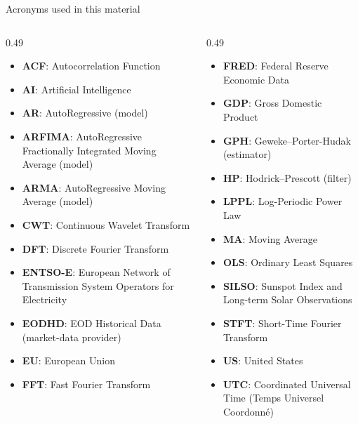 \begin{frame}{Acronyms used in this material}
\begin{columns}[T]
\begin{column}{0.49\textwidth}
\begin{itemize}\setlength{\itemsep}{0pt}
    \item \textbf{ACF}: Autocorrelation Function
    \item \textbf{AI}: Artificial Intelligence
    \item \textbf{AR}: AutoRegressive (model)
    \item \textbf{ARFIMA}: AutoRegressive Fractionally Integrated Moving Average (model)
    \item \textbf{ARMA}: AutoRegressive Moving Average (model)
    \item \textbf{CWT}: Continuous Wavelet Transform
    \item \textbf{DFT}: Discrete Fourier Transform
    \item \textbf{ENTSO-E}: European Network of Transmission System Operators for Electricity
    \item \textbf{EODHD}: EOD Historical Data (market-data provider)
    \item \textbf{EU}: European Union
    \item \textbf{FFT}: Fast Fourier Transform
\end{itemize}
\end{column}
\begin{column}{0.49\textwidth}
\begin{itemize}\setlength{\itemsep}{0pt}
    \item \textbf{FRED}: Federal Reserve Economic Data
    \item \textbf{GDP}: Gross Domestic Product
    \item \textbf{GPH}: Geweke–Porter-Hudak (estimator)
    \item \textbf{HP}: Hodrick–Prescott (filter)
    \item \textbf{LPPL}: Log-Periodic Power Law
    \item \textbf{MA}: Moving Average
    \item \textbf{OLS}: Ordinary Least Squares
    \item \textbf{SILSO}: Sunspot Index and Long-term Solar Observations
    \item \textbf{STFT}: Short-Time Fourier Transform
    \item \textbf{US}: United States
    \item \textbf{UTC}: Coordinated Universal Time (Temps Universel Coordonné)
\end{itemize}
\end{column}
\end{columns}
\end{frame}

